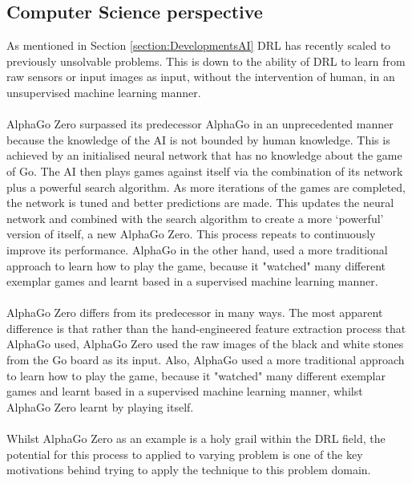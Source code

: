 \documentclass[ %
                    author={Ashwinder Khurana},
                supervisor={Prof Dave Cliff},
                    degree={MEng},
                     title={The Deeply Reinforced Trader},
                  subtitle={},
                      type={enterprise},
                      year={2020} ]{dissertation}
\begin{document}
\vspace{0.5cm}
\subsection{Computer Science perspective}
\label{subsection:Computer Science perspective}
\vspace{0.5cm} 
As mentioned in Section \ref{section:DevelopmentsAI} DRL has recently scaled to previously unsolvable problems. This is down to the ability of DRL to learn from raw sensors or input images as input, without the intervention of human, in an unsupervised machine learning manner. 
\\
\\
AlphaGo Zero surpassed its predecessor AlphaGo in an unprecedented manner because the knowledge of the AI is not bounded by human knowledge\cite{deepmind alpha go zero}. This is achieved by an initialised neural network that has no knowledge about the game of Go. The AI then plays games against itself via the combination of its network plus a powerful search algorithm. As more iterations of the games are completed, the network is tuned and better predictions are made. This updates the neural network and combined with the search algorithm to create a more \enquote*{powerful} version of itself, a new AlphaGo Zero. This process repeats to continuously improve its performance.
AlphaGo in the other hand, used a more traditional approach to learn how to play the game, because it "watched" many different exemplar games and learnt based in a supervised machine learning manner.
\\
\\
AlphaGo Zero differs from its predecessor in many ways. The most apparent difference is that rather than the hand-engineered feature extraction process that AlphaGo used, AlphaGo Zero used the raw images of the black and white stones from the Go board as its input. Also, AlphaGo used a more traditional approach to learn how to play the game, because it "watched" many different exemplar games and learnt based in a supervised machine learning manner, whilst AlphaGo Zero learnt by playing itself.
\\
\\
Whilst AlphaGo Zero as an example is a holy grail within the DRL field, the potential for this process to applied to varying problem is one of the key motivations behind trying to apply the technique to this problem domain.

\vspace{0.5cm}
\end{document}
